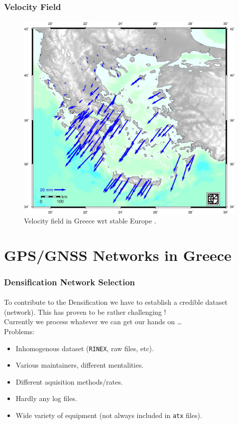 \documentclass{beamer}
\begin{document}
\begin{frame}\frametitle{Velocity Field}\framesubtitle{}
 \begin{figure}
 \begin{center}
 \includegraphics[width=.7\textwidth]{img/testvel.jpg}
 \caption{Velocity field in Greece wrt stable Europe \cite{papanikolaou}.}
 \label{fig:dgrm}
 \end{center}
 \end{figure}
\end{frame}

\section{GPS/GNSS Networks in Greece}

\begin{frame}\frametitle{Densification Network Selection}\framesubtitle{}
  To contribute to the Densification we have to establish a credible dataset
  (network). This has proven to be rather challenging !\\
  \bigskip
  Currently we process whatever we can get our hands on \ldots\\
  Problems:
  \begin{itemize}
    \item Inhomogenous dataset (\texttt{RINEX}, raw files, etc).
    \item Various maintainers, different mentalities.
    \item Different aquisition methods/rates.
    \item Hardly any log files.
    \item Wide variety of equipment (not always included in \texttt{atx} files).
  \end{itemize}
\end{frame}
\end{document}
